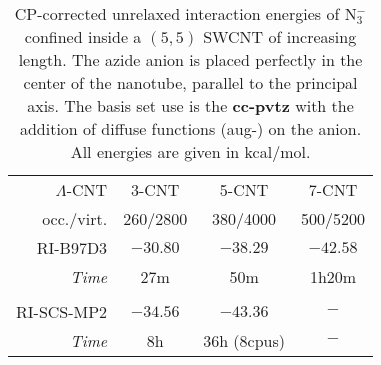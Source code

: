 \documentclass{article}
\begin{document}
%
%

%
\begin{table}
    \centering
    \begin{tabular}{r ccc}
        \toprule
        $\Lambda$-CNT & 3-CNT     & 5-CNT     & 7-CNT    \\
        occ./virt.    & 260/2800  & 380/4000  & 500/5200 \\
        \midrule
        RI-B97D3      & $-30.80$  & $-38.29$  & $-42.58$ \\
        \textit{Time} & 27m       & 50m       & 1h20m    \\
        \vspace{1mm} \\
        RI-SCS-MP2    & $-34.56$  & $-43.36$  & $-$      \\
        \textit{Time} & 8h        & 36h (8cpus) & $-$    \\
        \bottomrule
    \end{tabular}
    \caption{CP-corrected unrelaxed interaction energies of N$_3^-$ confined inside a $(5,5)$ SWCNT of increasing length. The azide anion is placed perfectly in the center of the nanotube, parallel to the principal axis. The basis set use is the \textbf{cc-pvtz} with the addition of diffuse functions (aug-) on the anion. All energies are given in kcal/mol.}
\label{tab:eint_cnt55x_cc-pvtz}
\end{table}
%
\end{document}
